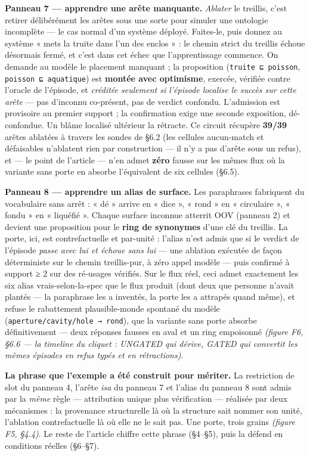 \documentclass[11pt]{article}
\begin{document}
\textbf{Panneau 7 — apprendre une arête manquante.} \emph{Ablater} le treillis, c'est retirer délibérément les arêtes sous une sorte pour simuler une ontologie incomplète — le cas normal d'un système déployé. Faites-le, puis donnez au système « mets la truite dans l'un des enclos » : le chemin strict du treillis échoue désormais fermé, et c'est dans cet échec que l'apprentissage commence. On demande au modèle le placement manquant ; la proposition (\texttt{truite ⊑ poisson}, \texttt{poisson ⊑ aquatique}) est \textbf{montée avec optimisme}, exercée, vérifiée contre l'oracle de l'épisode, et \emph{créditée seulement si l'épisode localise le succès sur cette arête} — pas d'inconnu co-présent, pas de verdict confondu. L'admission est provisoire au premier support ; la confirmation exige une seconde exposition, dé-confondue. Un blâme localisé ultérieur la rétracte. Ce circuit récupère \textbf{39/39} arêtes ablatées à travers les sondes de §6.2 (les cellules aucun-match et défaisables n'ablatent rien par construction — il n'y a pas d'arête sous un refus), et — le point de l'article — n'en admet \textbf{zéro} fausse sur les mêmes flux où la variante sans porte en absorbe l'équivalent de six cellules (§6.5).

\textbf{Panneau 8 — apprendre un alias de surface.} Les paraphrases fabriquent du vocabulaire sans arrêt : « dé » arrive en « dice », « rond » en « circulaire », « fondu » en « liquéfié ». Chaque surface inconnue atterrit OOV (panneau 2) et devient une proposition pour le \textbf{ring de synonymes} d'une clé du treillis. La porte, ici, est contrefactuelle et par-unité : l'alias n'est admis que si le verdict de l'épisode \emph{passe avec lui et échoue sans lui} — une ablation exécutée de façon déterministe sur le chemin treillis-pur, à zéro appel modèle — puis confirmé à support ≥ 2 sur des ré-usages vérifiés. Sur le flux réel, ceci admet exactement les six alias vrais-selon-la-spec que le flux produit (dont deux que personne n'avait plantés — la paraphrase les a inventés, la porte les a attrapés quand même), et refuse le rabattement plausible-monde spontané du modèle (\texttt{aperture/\allowbreak{}cavity/\allowbreak{}hole → rond}), que la variante sans porte absorbe définitivement — deux réponses fausses en aval et un ring empoisonné \emph{(figure F6, §6.6 — la timeline du cliquet : UNGATED qui dérive, GATED qui convertit les mêmes épisodes en refus typés et en rétractions)}.

\textbf{La phrase que l'exemple a été construit pour mériter.} La restriction de slot du panneau 4, l'arête \emph{isa} du panneau 7 et l'alias du panneau 8 sont admis par la \emph{même} règle — attribution unique plus vérification — réalisée par deux mécanismes : la provenance structurelle là où la structure sait nommer son unité, l'ablation contrefactuelle là où elle ne le sait pas. Une porte, trois grains \emph{(figure F5, §4.4)}. Le reste de l'article chiffre cette phrase (§4–§5), puis la défend en conditions réelles (§6–§7).
\end{document}
